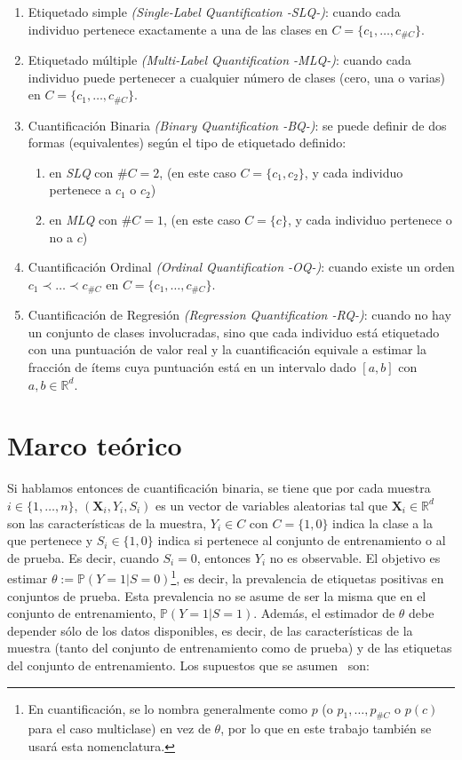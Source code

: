 \begin{enumerate}
    \item Etiquetado simple {\it (Single-Label Quantification -SLQ-)\/}: cuando
    cada individuo pertenece exactamente a una de las clases en
    $C=\{c_1,\dots,c_{\#C}\}$.
    \item Etiquetado múltiple {\it (Multi-Label Quantification -MLQ-)\/}: cuando
    cada individuo puede pertenecer a cualquier número de clases (cero, una o
    varias) en $C=\{c_1,\dots,c_{\#C}\}$.
    \item Cuantificación Binaria {\it (Binary Quantification -BQ-)\/}: se puede
    definir de dos formas (equivalentes) según el tipo de etiquetado definido:
    \begin{enumerate}
        \item en {\it SLQ\/} con $\#C=2$, (en este caso $C=\{c_1,c_2\}$, y cada
        individuo pertenece a $c_1$ o $c_2$)
        \item en {\it MLQ\/} con $\#C=1$, (en este caso $C=\{c\}$, y cada
        individuo pertenece o no a $c$)
    \end{enumerate}
    \item Cuantificación Ordinal {\it (Ordinal Quantification -OQ-)\/}: cuando
    existe un orden $c_1 \prec \dots \prec c_{\#C}$ en
    $C=\{c_1,\dots,c_{\#C}\}$.
    \item Cuantificación de Regresión {\it (Regression Quantification -RQ-)\/}:
    cuando no hay un conjunto de clases involucradas, sino que cada individuo
    está etiquetado con una puntuación de valor real y la cuantificación
    equivale a estimar la fracción de ítems cuya puntuación está en un intervalo
    dado $[a, b]$ con ${a, b \in \mathbb{R}^d}$.
\end{enumerate}

\section{Marco teórico}\label{problema:marco_teorico}

Si hablamos entonces de cuantificación binaria, se tiene que por cada muestra $i
\in \{1,\dots,n\}$, $(\boldsymbol{X}_i,Y_i,S_i)$ es un vector de variables
aleatorias tal que $\boldsymbol{X}_i \in \mathbb{R}^d$ son las características
de la muestra, $Y_i \in C$ con $C=\{1,0\}$ indica la clase a la que pertenece y
$S_i \in \{1,0\}$ indica si pertenece al conjunto de entrenamiento o al de
prueba. Es decir, cuando $S_i=0$, entonces $Y_i$ no es observable. El objetivo
es estimar $\theta:= \mathbb{P}(Y=1|S=0)$\footnote{En cuantificación, se lo
nombra generalmente como $p$ (o $p_1,\dots,p_{\#C}$ o $p(c)$ para el caso
multiclase) en vez de $\theta$, por lo que en este trabajo también se usará esta
nomenclatura.}, es decir, la prevalencia de etiquetas positivas en conjuntos de
prueba. Esta prevalencia no se asume de ser la misma que en el conjunto de
entrenamiento, $\mathbb{P}(Y=1|S=1)$. Además, el estimador de $\theta$ debe
depender sólo de los datos disponibles, es decir, de las características de la
muestra (tanto del conjunto de entrenamiento como de prueba) y de las etiquetas
del conjunto de entrenamiento. Los supuestos que se
asumen~\cite{vaz2019quantification} son:

